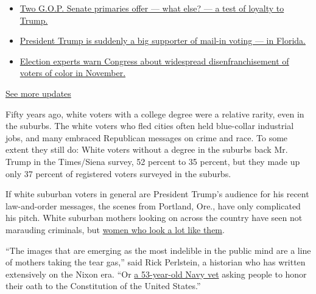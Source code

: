 \begin{itemize}
\tightlist
\item
  \href{https://www.nytimes.com/2020/08/04/us/elections/primary-election-michigan-arizona-kansas.html?action=click\&pgtype=Article\&state=default\&region=MAIN_CONTENT_1\&context=storylines_live_updates\#link-3924dd44}{Two
  G.O.P. Senate primaries offer --- what else? --- a test of loyalty to
  Trump.}
\item
  \href{https://www.nytimes.com/2020/08/04/us/elections/primary-election-michigan-arizona-kansas.html?action=click\&pgtype=Article\&state=default\&region=MAIN_CONTENT_1\&context=storylines_live_updates\#link-32b39e33}{President
  Trump is suddenly a big supporter of mail-in voting --- in Florida.}
\item
  \href{https://www.nytimes.com/2020/08/04/us/elections/primary-election-michigan-arizona-kansas.html?action=click\&pgtype=Article\&state=default\&region=MAIN_CONTENT_1\&context=storylines_live_updates\#link-6d019753}{Election
  experts warn Congress about widespread disenfranchisement of voters of
  color in November.}
\end{itemize}

\href{https://www.nytimes.com/2020/08/04/us/elections/primary-election-michigan-arizona-kansas.html?action=click\&pgtype=Article\&state=default\&region=MAIN_CONTENT_1\&context=storylines_live_updates}{See
more updates}

Fifty years ago, white voters with a college degree were a relative
rarity, even in the suburbs. The white voters who fled cities often held
blue-collar industrial jobs, and many embraced Republican messages on
crime and race. To some extent they still do: White voters without a
degree in the suburbs back Mr. Trump in the Times/Siena survey, 52
percent to 35 percent, but they made up only 37 percent of registered
voters surveyed in the suburbs.

If white suburban voters in general are President Trump's audience for
his recent law-and-order messages, the scenes from Portland, Ore., have
only complicated his pitch. White suburban mothers looking on across the
country have seen not marauding criminals, but
\href{https://www.nytimes.com/2020/07/27/parenting/wall-of-moms-protests.html?action=click\&module=Top\%20Stories\&pgtype=Homepage}{women
who look a lot like them}.

``The images that are emerging as the most indelible in the public mind
are a line of mothers taking the tear gas,'' said Rick Perlstein, a
historian who has written extensively on the Nixon era. ``Or
\href{https://www.nytimes.com/2020/07/20/us/portland-protests-navy-christopher-david.html}{a
53-year-old Navy vet} asking people to honor their oath to the
Constitution of the United States.''

